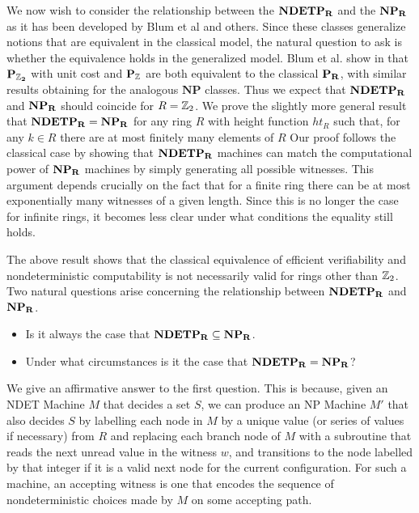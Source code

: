 We now wish to consider the relationship between the $\mathbf{NDETP_R}$ and the
$\mathbf{NP_R}$ as it has been developed by Blum et al and others.  Since these
classes generalize notions that are equivalent in the classical model,
the natural question to ask is whether the equivalence holds in the
generalized model.  Blum et al. show in \cite{B89} that $\mathbf{P_{\mathbb{Z}_{2}}}$
with unit cost and $\mathbf{P_{\mathbb{Z}}}$ are both equivalent to the
classical $\mathbf{P_R}$, with similar results obtaining for the analogous
$\mathbf{NP}$ classes.  Thus we expect that $\mathbf{NDETP_R}$ and $\mathbf{NP_R}$ should
coincide for $R = \mathbb{Z}_{2}$.  We prove the slightly more general result
that $\mathbf{NDETP_R} = \mathbf{NP_R}$ for any ring $R$ with height function $ht_R$ such
that, for any $k \in R$ there are at most finitely many elements of
$R$ Our proof follows the classical case by showing that $\mathbf{NDETP_R}$
machines can match the computational power of $\mathbf{NP_R}$ machines by simply
generating all possible witnesses.  This argument depends crucially on
the fact that for a finite ring there can be at most exponentially
many witnesses of a given length.  Since this is no longer the case
for infinite rings, it becomes less clear under what conditions the
equality still holds.




The above result shows that the classical equivalence of efficient
verifiability and nondeterministic computability is not necessarily
valid for rings other than $\mathbb{Z}_2$.  Two natural questions
arise concerning the relationship between $\mathbf{NDETP_R}$ and $\mathbf{NP_R}$.  

\begin{itemize}
\item Is it always the case that $\mathbf{NDETP_R} \subseteq \mathbf{NP_R}$.
\item Under what circumstances is it the case that $\mathbf{NDETP_R} = \mathbf{NP_R}$?
\end{itemize}

We give an affirmative answer to the first question.  This is
because, given an NDET Machine $M$ that decides a set $S$, we can
produce an NP Machine $M'$ that also decides $S$ by labelling each
node in $M$ by a unique value (or series of values if necessary)
from $R$ and replacing each branch node of $M$ with a subroutine
that reads the next unread value in the witness $w$, and transitions
to the node labelled by that integer if it is a valid next node for
the current configuration. For such a machine, an accepting witness
is one that encodes the sequence of nondeterministic choices made by
$M$ on some accepting path.

